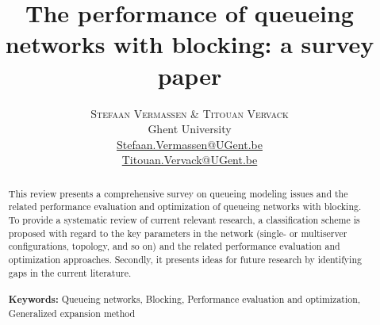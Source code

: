 \documentclass[twoside]{article}
\title{\vspace{-15mm}\fontsize{24pt}{10pt}\selectfont\textbf{The performance of queueing networks with blocking: a survey paper}} %
\author{
\large
\textsc{Stefaan Vermassen \& Titouan Vervack}\\[2mm] 
\normalsize Ghent University \\ 
\normalsize \href{mailto:Stefaan.Vermassen@UGent.be}{Stefaan.Vermassen@UGent.be} \\
\normalsize \href{mailto:Titouan.Vervack@UGent.be}{Titouan.Vervack@UGent.be} 
\vspace{-5mm}
}
\date{}
\begin{document}
\maketitle %

\thispagestyle{fancy} %


\begin{abstract}

This review presents a comprehensive survey on queueing modeling issues and the related performance evaluation and optimization of queueing networks with blocking. To provide a systematic review of current relevant research, a classification scheme is proposed with regard to the key parameters in the network (single- or multiserver configurations, topology, and so on) and the related performance evaluation and optimization approaches. Secondly,  it presents ideas for future research by identifying gaps in the current literature.\\\\
\textbf{Keywords:} Queueing networks, Blocking, Performance evaluation and optimization, Generalized expansion method
\end{abstract}
\vspace{12mm}
\end{document}
